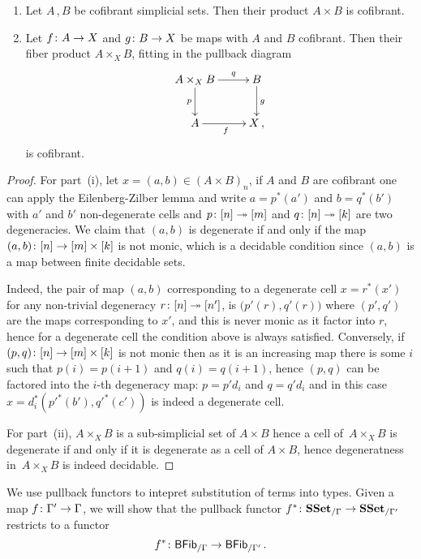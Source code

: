 \documentclass[reqno,10pt,a4paper,oneside,draft]{amsart}
\begin{document}
\begin{proposition}\label{lem:cofibrant_fiber_product} \hfill 
\begin{enumerate}[$(i)$] 
\item Let $A \, , B$ be cofibrant simplicial sets. Then their product $A \times B$ is cofibrant.
\item Let $f \colon A \to X$ and $g \colon B \to X$ be maps with $A$ and $B$ cofibrant. Then their
fiber product $A \times_X B$, fitting in the pullback diagram
\[
\xymatrix{
A \times_X B \ar[r]^-{q} \ar[d]_-{p} & B \ar[d]^g \\
A \ar[r]_f & X \, ,}
\]
is cofibrant.
\end{enumerate}
\end{proposition}

\begin{proof} For part~(i), let $x = (a,b) \in (A \times B)_n$, if $A$ and $B$ are cofibrant one can apply the Eilenberg-Zilber lemma and write $a = p^*(a')$ and $b = q^*(b')$ with $a'$ and $b'$ non-degenerate cells and $p \colon [n] \twoheadrightarrow [m]$ and $q \colon [n] \twoheadrightarrow [k]$ are two degeneracies. We claim that $(a,b)$ is degenerate if and only if the map $(a ,b )  \colon [n] \rightarrow [m] \times [k]$ is not monic, which is a decidable condition since $(a,b)$ is a map between finite decidable sets.

Indeed, the pair of map $(a,b)$ corresponding to a degenerate cell $x=r^*(x')$ for any non-trivial degeneracy $r \colon [n] \twoheadrightarrow [n']$, is  $\big( p'(r),q'(r) \big)$ where $(p',q')$ are the maps corresponding to $x'$, and this is never monic as it factor into $r$, hence for a degenerate cell the condition above is always satisfied. Conversely, if $(p,q)\colon [n] \rightarrow [m] \times [k]$ is not monic then as it is an increasing map there is some $i$ such that $p(i)=p(i+1)$ and $q(i)=q(i+1)$, hence $(p,q)$ can be factored into the $i$-th degeneracy map: $p=p' d_i$ and $q=q' d_i$ and in this case $x= d_i^* (p'^*(b'),q'^*(c'))$ is indeed a degenerate cell.


For part~(ii), $A \times_X B$ is a sub-simplicial set of $A \times B$ hence a cell of~$A \times_X B$ is degenerate if and only if it is degenerate as a cell of $A \times B$, hence degeneratness 
in~$A \times_X B$ is indeed decidable. 
\end{proof}






We use pullback functors to intepret substitution of terms into types. Given a map $f \colon \Gamma' \to \Gamma$, we will show that the pullback functor $f^* \colon \mathbf{SSet}_{/\Gamma} \to \mathbf{SSet}_{/\Gamma'}$ restricts to a functor
\[
f^* \colon \mathsf{BFib}_{/\Gamma}  \to \mathsf{BFib}_{/\Gamma'} \, .
\]
\end{document}
